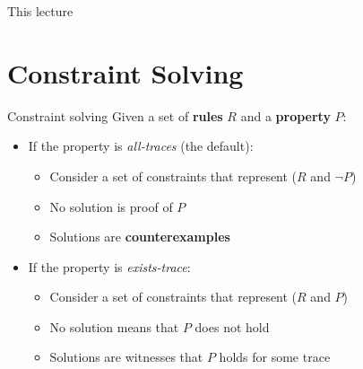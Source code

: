 \documentclass[11pt,aspectratio=169]{beamer}
\begin{document}
\begin{frame}[fragile]{This lecture}
    \tableofcontents
\end{frame}


\section{Constraint Solving}


\begin{frame}[fragile]{Constraint solving}
    Given a set of \textbf{rules} $R$ and a \textbf{property} $P:$
    \begin{itemize}
        \item If the property is \textit{all-traces} (the default):
            \begin{itemize}
                \item Consider a set of constraints that represent
                      ($R$ and $\neg P$)
                \item No solution is proof of $P$
                \item Solutions are \textbf{counterexamples}
            \end{itemize}
        \item If the property is \textit{exists-trace}:
            \begin{itemize}
                \item Consider a set of constraints that represent ($R$ and $P$)
                \item No solution means that $P$ does not hold
                \item Solutions are witnesses that $P$ holds for some trace
            \end{itemize}
    \end{itemize}
\end{frame}
\end{document}
